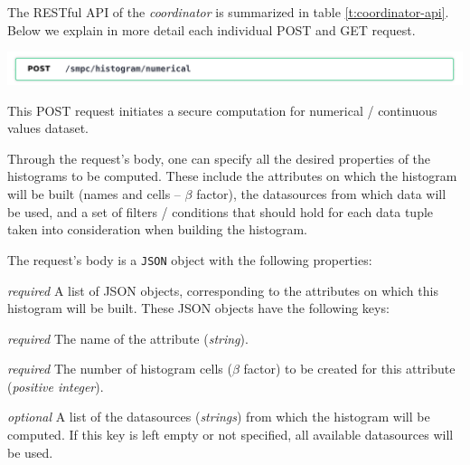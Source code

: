 The RESTful API of the \textit{coordinator} is summarized in table \ref{t:coordinator-api}.
Below we explain in more detail each individual POST and GET request.

\includegraphics[page=1,width=\textwidth]{figures/post1.pdf}
\begin{itemize}
  \item[]
  This POST request initiates a secure computation for numerical / continuous values dataset.

  Through the request's body, one can specify all the desired properties of the histograms to be computed.
  These include the attributes on which the histogram will be built (names and cells -- $\beta$ factor), the datasources from which data will be used, and a set of filters / conditions that should hold for each data tuple taken into consideration when building the histogram.


  The request's body is a \texttt{JSON} object with the following properties:

\begin{description}[labelwidth=6em, leftmargin=\dimexpr\labelwidth+\labelsep\relax]
  
    \item[\texttt{attributes}:] {\color{red}\textit{required}} A list of JSON objects, corresponding to the attributes on which this histogram will be built.
    These JSON objects have the following keys:
    
    \begin{description}[labelwidth=6em, leftmargin=\dimexpr\labelwidth+\labelsep\relax]
        \item[\texttt{name}:] {\color{red}\textit{required}} The name of the attribute (\textit{string}).
        
        \item[\texttt{cells}:] {\color{red}\textit{required}} The number of histogram cells ($\beta$ factor) to be created for this attribute (\textit{positive integer}).
    \end{description}
    
    \item[\texttt{datasources}:] {\color{blue}\textit{optional}} A list of the datasources (\textit{strings}) from which the histogram will be computed.
    If this key is left empty or not specified, all available datasources will be used.
    

\end{description}
\end{itemize}
